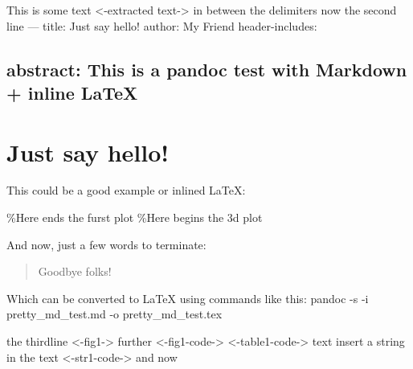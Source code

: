 \documentclass[
]{article}
\author{}
\date{}
\begin{document}
This is some text \textless-extracted text-\textgreater{} in between the
delimiters now the second line --- title: Just say hello! author: My
Friend header-includes: \textbar{}

\usepackage{tikz,pgfplots}
    \usepackage{fancyhdr}
    \pagestyle{fancy}
    \fancyfoot[LE,RO]{\thepage}

\hypertarget{abstract-this-is-a-pandoc-test-with-markdown-inline-latex}{%
\subsection{abstract: This is a pandoc test with Markdown + inline
LaTeX}\label{abstract-this-is-a-pandoc-test-with-markdown-inline-latex}}

\hypertarget{just-say-hello}{%
\section{Just say hello!}\label{just-say-hello}}

This could be a good example or inlined \LaTeX:


\%Here ends the furst plot \hskip 5pt \%Here begins the 3d plot


And now, just a few words to terminate:

\begin{quote}
Goodbye folks!
\end{quote}

Which can be converted to LaTeX using commands like this: pandoc -s -i
pretty\_md\_test.md -o pretty\_md\_test.tex

the thirdline \textless-fig1-\textgreater{} further
\textless-fig1-code-\textgreater{} \textless-table1-code-\textgreater{}
text insert a string in the text \textless-str1-code-\textgreater{} and
now
\end{document}

